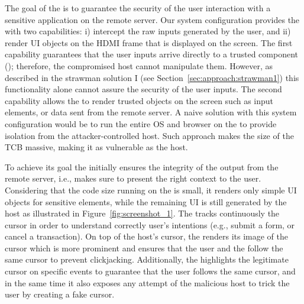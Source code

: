 The goal of the \device is to guarantee the security %
of the user interaction with a sensitive application on the remote server. Our system configuration provides the \device with two capabilities: i) intercept the raw inputs generated by the user, and ii) render UI objects on the HDMI frame that is displayed on the screen. 
The first capability guarantees that the user inputs arrive directly to a trusted component (\device); therefore, the compromised host cannot manipulate them. However, as described in the strawman solution I (see Section~\ref{sec:approach:strawman1}) this functionality alone cannot assure the security of the user inputs. The second capability allows the \device to render trusted objects on the screen such as input elements, or data sent from the remote server. 
A naive solution with this system configuration would be to run the entire OS and browser on the \device to provide isolation from the attacker-controlled host. Such approach makes the size of the \device TCB massive, making it as vulnerable as the host.

To achieve its goal the \device initially ensures the integrity of the output from the remote server, i.e., makes sure to present the right context to the user. Considering that the code size running on the \device is small, it renders only simple UI objects for sensitive elements, while the remaining UI is still generated by the host as illustrated in Figure~\ref{fig:screenshot_1}. The \device tracks continuously the cursor in order to understand correctly user's intentions (e.g., submit a form, or cancel a transaction). On top of the host's cursor, the \device renders its image of the cursor which is more prominent and ensures that the user and the \device follow the same cursor to prevent clickjacking. Additionally, the \device highlights the legitimate cursor on specific events to guarantee that the user follows the same cursor, and in the same time it also exposes any attempt of the malicious host to trick the user by creating a fake cursor. %

